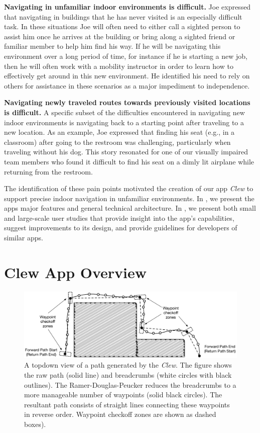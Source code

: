 \documentclass[chi_draft]{sigchi}
\begin{document}
\textbf{Navigating in unfamiliar indoor environments is difficult.} Joe expressed that navigating in buildings that he has never visited is an especially difficult task.  In these situations Joe will often need to either call a sighted person to assist him once he arrives at the building or bring along a sighted friend or familiar member to help him find his way.  If he will be navigating this environment over a long period of time, for instance if he is starting a new job, then he will often work with a mobility instructor in order to learn how to effectively get around in this new environment.  He identified his need to rely on others for assistance in these scenarios as a major impediment to independence.

\textbf{Navigating newly traveled routes towards previously visited locations is difficult.} A specific subset of the difficulties encountered in navigating new indoor environments is navigating back to a starting point after traveling to a new location.  As an example, Joe expressed that finding his seat (e.g., in a classroom) after going to the restroom was challenging, particularly when traveling without his dog. This story resonated for one of our visually impaired team members who found it difficult to find his seat on a dimly lit airplane while returning from the restroom.

The identification of these pain points motivated the creation of our app \emph{Clew} to support precise indoor navigation in unfamiliar environments.  In \emph{}, we present the apps major features and general technical architecture.  In \emph{}, we present both small and large-scale user studies that provide insight into the app's capabilities, suggest improvements to its design, and provide guidelines for developers of similar apps.

\section{Clew App Overview}\label{sec:clewoverview}

\begin{figure}
\begin{center}
\includegraphics[width=\linewidth]{Figures/samplepath}
\end{center}
\caption{A topdown view of a path generated by the \emph{Clew}.  The figure shows the raw path (solid line) and breadcrumbs (white circles with black outlines).  The Ramer-Douglas-Peucker reduces the breadcrumbs to a more manageable number of waypoints (solid black circles).  The resultant path consists of straight lines connecting these waypoints in reverse order.  Waypoint checkoff zones are shown as dashed boxes).\label{fig:samplepath}}
\end{figure}
\end{document}
